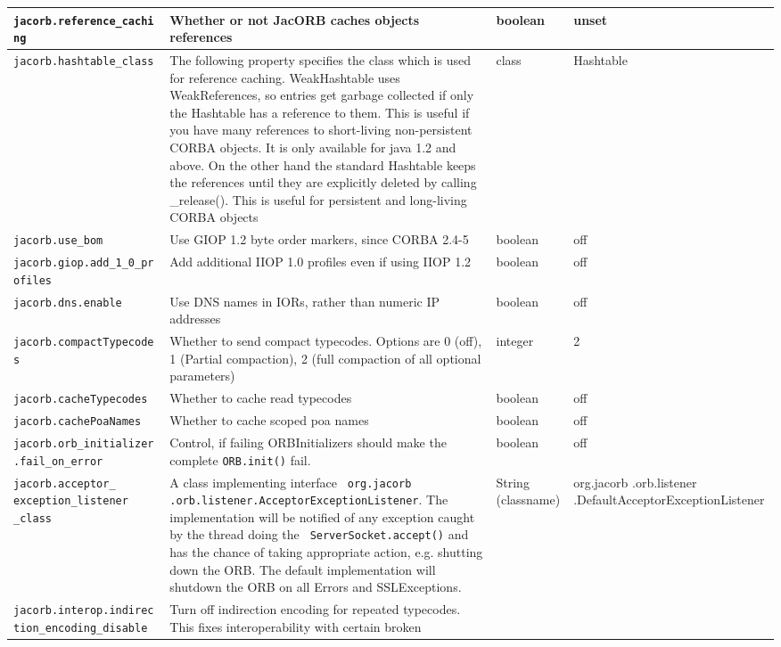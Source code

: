 {{\begin{small}
\begin{longtable}{|p{5cm}|p{7.5cm}|p{1.5cm}|p{1.5cm}|}
\hline
\verb"jacorb.reference_cachi"
\verb"ng" & Whether or not JacORB caches objects references & boolean & unset  \\
\hline
\verb"jacorb.hashtable_class" & The following property specifies the
class which is used for reference caching. WeakHashtable uses
WeakReferences, so entries get garbage collected if only the Hashtable
has a reference to them. This is useful if you have many references to
short-living non-persistent CORBA objects. It is only available for
java 1.2 and above. On the other hand the standard Hashtable keeps the
references until they are explicitly deleted by calling
\_release(). This is useful for persistent and long-living CORBA
objects & class & Hashtable \\
\hline
\verb"jacorb.use_bom" & Use GIOP 1.2 byte order markers, since CORBA
2.4-5 & boolean & off  \\
\hline
\verb"jacorb.giop.add_1_0_pr"
\verb"ofiles" & Add additional IIOP 1.0 profiles even if using IIOP
1.2 & boolean & off \\
\hline
\verb"jacorb.dns.enable" & Use DNS names in IORs, rather than numeric
IP addresses & boolean & off \\
\hline
\verb"jacorb.compactTypecode"
\verb"s" & Whether to send compact typecodes. Options are 0 (off), 1
(Partial compaction), 2 (full compaction of all optional parameters) & integer & 2 \\
\hline
\verb"jacorb.cacheTypecodes" & Whether to cache read
typecodes  & boolean & off \\
\hline
\verb"jacorb.cachePoaNames" & Whether to cache scoped poa
names & boolean & off \\
\hline
\verb"jacorb.orb_initializer"
\verb".fail_on_error" & Control, if failing ORBInitializers should make the
complete {\tt ORB.init()} fail. & boolean & off \\
\hline
\verb"jacorb.acceptor_"
\verb"exception_listener"
\verb"_class" & A class implementing interface {\tt
  org.jacorb .orb.listener.AcceptorException\-Listener}. The implementation
will be notified of any exception caught by the thread doing the {\tt
  ServerSocket.accept()} and has the chance of taking appropriate action,
e.g. shutting down the ORB. The default implementation will shutdown the ORB
on all Errors and SSLExceptions. & String (classname) & org.jacorb
.orb.listener .DefaultAcceptorExceptionListener \\
\hline
\verb"jacorb.interop.indirec"
\verb"tion_encoding_disable" & Turn off indirection encoding for
repeated typecodes. This fixes interoperability with certain broken

\end{longtable}
\end{small}}}
